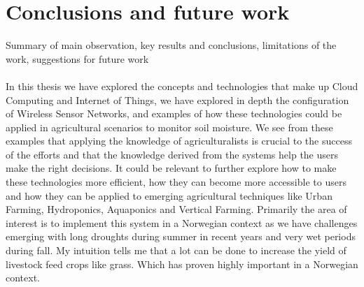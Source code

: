 \documentclass[]{uiophd}
\begin{document}
\chapter{Conclusions and future work}

Summary of main observation, key results and conclusions, limitations of the work, suggestions for future work
\\\\
In this thesis we have explored the concepts and technologies that make up Cloud Computing and Internet of Things, we have explored in depth the configuration of Wireless Sensor Networks, and examples of how these technologies could be applied in agricultural scenarios to monitor soil moisture. We see from these examples that applying the knowledge of agriculturalists is crucial to the success of the efforts and that the knowledge derived from the systems help the users make the right decisions. It could be relevant to further explore how to make these technologies more efficient, how they can become more accessible to users and how they can be applied to emerging agricultural techniques like Urban Farming, Hydroponics, Aquaponics and Vertical Farming. Primarily the area of interest is to implement this system in a Norwegian context as we have challenges emerging with long droughts during summer in recent years and very wet periods during fall. My intuition tells me that a lot can be done to increase the yield of livestock feed crops like grass. Which has proven highly important in a Norwegian context.
\end{document}
